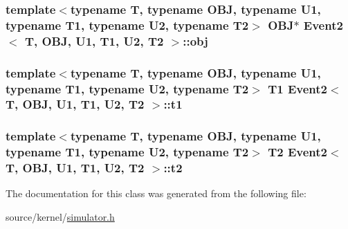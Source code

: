 \hypertarget{classEvent2_e87200a757f09d76ae6aa5abd293f062}{
\subsubsection[{obj}]{\setlength{\rightskip}{0pt plus 5cm}template$<$typename T, typename OBJ, typename U1, typename T1, typename U2, typename T2$>$ OBJ$\ast$ {\bf Event2}$<$ T, OBJ, U1, T1, U2, T2 $>$::{\bf obj}}}
\label{classEvent2_e87200a757f09d76ae6aa5abd293f062}


\hypertarget{classEvent2_b3e9b3c8ae4bff79e765e54a4947f371}{
\subsubsection[{t1}]{\setlength{\rightskip}{0pt plus 5cm}template$<$typename T, typename OBJ, typename U1, typename T1, typename U2, typename T2$>$ T1 {\bf Event2}$<$ T, OBJ, U1, T1, U2, T2 $>$::{\bf t1}}}
\label{classEvent2_b3e9b3c8ae4bff79e765e54a4947f371}


\hypertarget{classEvent2_d921b4a0baa31fa2400fd022bf3b43e9}{
\subsubsection[{t2}]{\setlength{\rightskip}{0pt plus 5cm}template$<$typename T, typename OBJ, typename U1, typename T1, typename U2, typename T2$>$ T2 {\bf Event2}$<$ T, OBJ, U1, T1, U2, T2 $>$::{\bf t2}}}
\label{classEvent2_d921b4a0baa31fa2400fd022bf3b43e9}




The documentation for this class was generated from the following file:\begin{CompactItemize}
\item 
source/kernel/\hyperlink{simulator_8h}{simulator.h}\end{CompactItemize}
